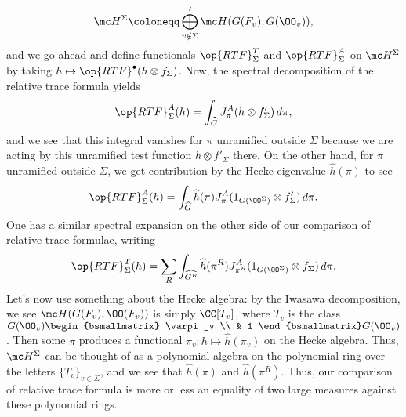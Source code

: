 \documentclass[../notes.tex]{subfiles}
\begin{document}
\[\mc H^\Sigma\coloneqq\bigoplus_{v\notin\Sigma}'\mc H(G(F_v),G(\OO_v)),\]
and we go ahead and define functionals $\op{RTF}^T_\Sigma$ and $\op{RTF}^A_\Sigma$ on $\mc H^\Sigma$ by taking $h\mapsto\op{RTF}^\bullet(h\otimes f_\Sigma)$. Now, the spectral decomposition of the relative trace formula yields
\[\op{RTF}^A_\Sigma(h)=\int_{\widehat G}J_\pi^A(h\otimes f'_\Sigma)\,d\pi,\]
and we see that this integral vanishes for $\pi$ unramified outside $\Sigma$ because we are acting by this unramified test function $h\otimes f'_\Sigma$ there. On the other hand, for $\pi$ unramified outside $\Sigma$, we get contribution by the Hecke eigenvalue $\widehat h(\pi)$ to see
\[\op{RTF}^A_\Sigma(h)=\int_{\widehat G} \widehat h(\pi)J_\pi^A(1_{G(\OO^\Sigma)}\otimes f_\Sigma')\,d\pi.\]
One has a similar spectral expansion on the other side of our comparison of relative trace formulae, writing
\[\op{RTF}^T_{\Sigma}(h)=\sum_R\int_{\widehat{G^R}}\widehat h(\pi^R)J^A_{\pi^R}(1_{G(\OO^\Sigma)}\otimes f_\Sigma)\,d\pi.\]
Let's now use something about the Hecke algebra: by the Iwasawa decomposition, we see $\mc H(G(F_v),\OO(F_v))$ is simply $\CC[T_v]$, where $T_v$ is the class $G(\OO_v)\begin{bsmallmatrix}
	\varpi_v \\ & 1
\end{bsmallmatrix}G(\OO_v)$. Then some $\pi$ produces a functional $\pi_v\colon h\mapsto\widehat h(\pi_v)$ on the Hecke algebra. Thus, $\mc H^\Sigma$ can be thought of as a polynomial algebra on the polynomial ring over the letters $\{T_v\}_{v\in\Sigma}$, and we see that $\widehat h(\pi)$ and $\widehat h(\pi^R)$. Thus, our comparison of relative trace formula is more or less an equality of two large measures against these polynomial rings.
\end{document}
